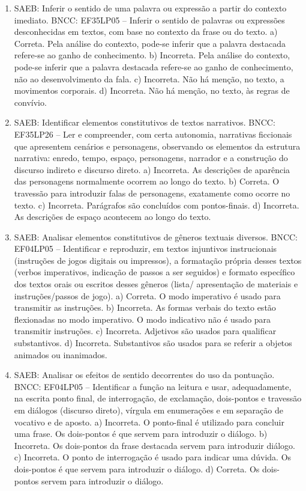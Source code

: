 \begin{enumerate}
\item
SAEB: Inferir o sentido de uma palavra ou expressão a partir do contexto imediato. BNCC: EF35LP05 -- Inferir o sentido de palavras ou expressões desconhecidas em textos, com base no contexto da frase ou do texto. a) Correta. Pela análise do contexto, pode-se inferir que a palavra destacada refere-se ao ganho de conhecimento. b) Incorreta. Pela análise do contexto, pode-se inferir que a palavra destacada refere-se ao ganho de conhecimento, não ao desenvolvimento da fala. c) Incorreta. Não há menção, no texto, a movimentos corporais. d) Incorreta. Não há menção, no texto, às regras de convívio.

\item
SAEB: Identificar elementos constitutivos de textos narrativos. BNCC: EF35LP26 -- Ler e compreender, com certa autonomia, narrativas ficcionais que apresentem cenários e personagens, observando os elementos da estrutura narrativa: enredo, tempo, espaço, personagens, narrador e a construção do discurso indireto e discurso direto. a) Incorreta. As descrições de aparência das personagens normalmente ocorrem ao longo do texto. b) Correta. O travessão para introduzir falas de personagens, exatamente como ocorre no texto. c) Incorreta. Parágrafos são concluídos com pontos-finais. d) Incorreta. As descrições de espaço acontecem ao longo do texto.

\item
SAEB: Analisar elementos constitutivos de gêneros textuais diversos. BNCC: EF04LP05 -- Identificar e reproduzir, em textos injuntivos instrucionais (instruções de jogos digitais ou impressos), a formatação própria desses textos (verbos imperativos, indicação de passos a ser seguidos) e formato específico dos textos orais ou escritos desses gêneros (lista/ apresentação de materiais e instruções/passos de jogo). a) Correta. O modo imperativo é usado para transmitir as instruções. b) Incorreta. As formas verbais do texto estão flexionadas no modo imperativo. O modo indicativo não é usado para transmitir instruções. c) Incorreta. Adjetivos são usados para qualificar substantivos. d) Incorreta. Substantivos são usados para se referir a objetos animados ou inanimados.

\item
SAEB: Analisar os efeitos de sentido decorrentes do uso da pontuação. BNCC: EF04LP05 -- Identificar a função na leitura e usar, adequadamente, na escrita ponto final, de interrogação, de exclamação, dois-pontos e travessão em diálogos (discurso direto), vírgula em enumerações e em separação de vocativo e de aposto. a) Incorreta. O ponto-final é utilizado para concluir uma frase. Os dois-pontos é que servem para introduzir o diálogo. b) Incorreta. Os dois-pontos da frase destacada servem para introduzir diálogo. c) Incorreta. O ponto de interrogação é usado para indicar uma dúvida. Os dois-pontos é que servem para introduzir o diálogo. d) Correta. Os dois-pontos servem para introduzir o diálogo.


\end{enumerate}
